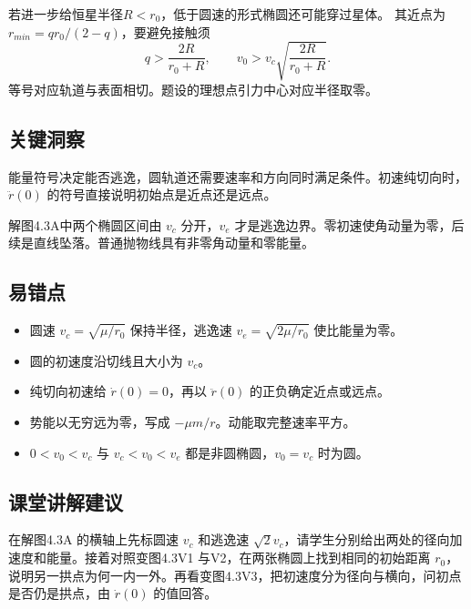 \documentclass[UTF8,fontset=fandol,a4paper,11pt]{ctexart}
\begin{document}
若进一步给恒星半径$R<r_0$，低于圆速的形式椭圆还可能穿过星体。
其近点为$r_{min}=qr_0/(2-q)$，要避免接触须
\[
q>\frac{2R}{r_0+R},\qquad
v_0>v_c\sqrt{\frac{2R}{r_0+R}}.
\]
等号对应轨道与表面相切。题设的理想点引力中心对应半径取零。




\subsection*{关键洞察}

能量符号决定能否逃逸，圆轨道还需要速率和方向同时满足条件。初速纯切向时，\(\ddot r(0)\)
的符号直接说明初始点是近点还是远点。

解图4.3A中两个椭圆区间由 \(v_c\) 分开，\(v_e\)
才是逃逸边界。零初速使角动量为零，后续是直线坠落。普通抛物线具有非零角动量和零能量。



\subsection*{易错点}

\begin{itemize}
\item 圆速 $v_c=\sqrt{\mu/r_0}$ 保持半径，逃逸速 $v_e=\sqrt{2\mu/r_0}$ 使比能量为零。
\item 圆的初速度沿切线且大小为 $v_c$。
\item 纯切向初速给 $\dot r(0)=0$，再以 $\ddot r(0)$ 的正负确定近点或远点。
\item 势能以无穷远为零，写成 $-\mu m/r$。动能取完整速率平方。
\item $0<v_0<v_c$ 与 $v_c<v_0<v_e$ 都是非圆椭圆，$v_0=v_c$ 时为圆。
\end{itemize}



\subsection*{课堂讲解建议}

在解图4.3A 的横轴上先标圆速 $v_c$ 和逃逸速 $\sqrt2v_c$，请学生分别给出两处的径向加速度和能量。接着对照变图4.3V1 与V2，在两张椭圆上找到相同的初始距离 $r_0$，说明另一拱点为何一内一外。再看变图4.3V3，把初速度分为径向与横向，问初点是否仍是拱点，由 $\dot r(0)$ 的值回答。
\end{document}

